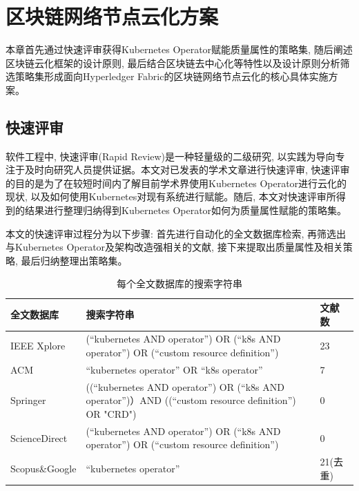 \chapter{区块链网络节点云化方案}

本章首先通过快速评审获得Kubernetes Operator赋能质量属性的策略集,  随后阐述区块链云化框架的设计原则, 最后结合区块链去中心化等特性以及设计原则分析筛选策略集形成面向Hyperledger Fabric的区块链网络节点云化的核心具体实施方案。

\section{快速评审}\label{section: rapid_reviews}

软件工程中, 快速评审(Rapid Review)是一种轻量级的二级研究, 以实践为导向专注于及时向研究人员提供证据\cite{cartaxo2020rapid}。本文对已发表的学术文章进行快速评审, 快速评审的目的是为了在较短时间内了解目前学术界使用Kubernetes Operator进行云化的现状, 以及如何使用Kubernetes对现有系统进行赋能。随后, 本文对快速评审所得到的结果进行整理归纳得到Kubernetes Operator如何为质量属性赋能的策略集。

本文的快速评审过程分为以下步骤: 首先进行自动化的全文数据库检索, 再筛选出与Kubernetes Operator及架构改造强相关的文献, 接下来提取出质量属性及相关策略, 最后归纳整理出策略集。

{\footnotesize
\begin{longtable}[h]{m{60pt} m{210pt} m{40pt}<{\centering}}
    \caption[每个全文数据库的搜索字符串]{每个全文数据库的搜索字符串} \label{search_string} \\
        \toprule  
        \textbf{全文数据库}&\textbf{搜索字符串}&\textbf{文献数}\\
        \hline
        IEEE Xplore &(“kubernetes AND operator”) OR (“k8s AND operator”) OR (“custom resource definition”) & 23 \\

        ACM & “kubernetes operator” OR “k8s operator” & 7 \\

        Springer &((“kubernetes AND operator”) OR (“k8s AND operator”)）AND ((“custom resource definition”) OR "CRD") & 0 \\

        ScienceDirect &(“kubernetes AND operator”) OR (“k8s AND operator”) OR (“custom resource definition”) & 0 \\
        \hline
        Scopus\&Google &“kubernetes operator”& 21(去重) \\
        \bottomrule
    \end{longtable}
}

